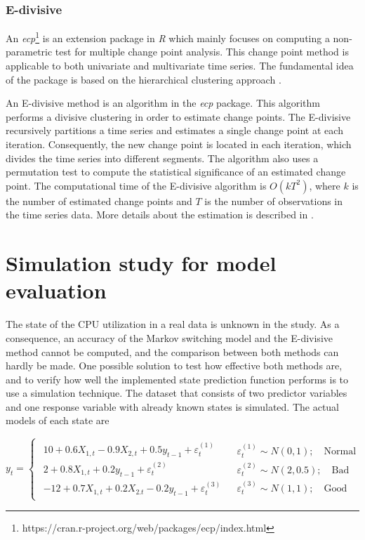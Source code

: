\subsubsection*{E-divisive}

An \emph{ecp}\footnote{https://cran.r-project.org/web/packages/ecp/index.html}
is an extension package in \emph{R} which mainly focuses on computing
a non-parametric test for multiple change point analysis. This change
point method is applicable to both univariate and multivariate time
series. The fundamental idea of the package is based on the hierarchical
clustering approach \citep{james2013ecp}. 

An E-divisive method is an algorithm in the \emph{ecp} package. This
algorithm performs a divisive clustering in order to estimate change
points. The E-divisive recursively partitions a time series and estimates
a single change point at each iteration. Consequently, the new change
point is located in each iteration, which divides the time series
into different segments. The algorithm also uses a permutation test
to compute the statistical significance of an estimated change point.
The computational time of the E-divisive algorithm is $O(kT^{2})$,
where $k$ is the number of estimated change points and $T$ is the
number of observations in the time series data. More details about
the estimation is described in \citet{matteson2014nonparametric}. 

\section{Simulation study for model evaluation \label{sec:Simulation}}

The state of the CPU utilization in a real data is unknown in the
study. As a consequence, an accuracy of the Markov switching model
and the E-divisive method cannot be computed, and the comparison between
both methods can hardly be made. One possible solution to test how
effective both methods are, and to verify how well the implemented
state prediction function performs is to use a simulation technique.
The dataset that consists of two predictor variables and one response
variable with already known states is simulated. The actual models
of each state are 

\[
y_{t}=\begin{cases}
\begin{array}{c}
10+0.6X_{1,t}-0.9X{}_{2,t}+0.5y_{t-1}+\varepsilon_{t}^{(1)}\\
2+0.8X_{1,t}+0.2y_{t-1}+\varepsilon_{t}^{(2)}\\
-12+0.7X_{1,t}+0.2X{}_{2.t}-0.2y_{t-1}+\varepsilon_{t}^{(3)}
\end{array} & \begin{array}{c}
\varepsilon_{t}^{(1)}\sim N(0,1);\quad\mathrm{Normal}\\
\varepsilon_{t}^{(2)}\sim N(2,0.5);\quad\mathrm{Bad}\\
\varepsilon_{t}^{(3)}\sim N(1,1);\quad\mathrm{Good}
\end{array}\end{cases}
\]

